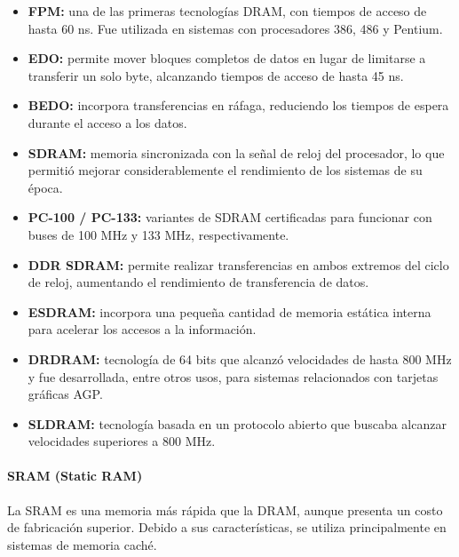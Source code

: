 \documentclass[10pt]{article}
\begin{document}
\begin{itemize}
\item \textbf{FPM:} una de las primeras tecnologías DRAM, con tiempos de acceso de hasta 60 ns. Fue utilizada en sistemas con procesadores 386, 486 y Pentium.

\item \textbf{EDO:} permite mover bloques completos de datos en lugar de limitarse a transferir un solo byte, alcanzando tiempos de acceso de hasta 45 ns.

\item \textbf{BEDO:} incorpora transferencias en ráfaga, reduciendo los tiempos de espera durante el acceso a los datos.

\item \textbf{SDRAM:} memoria sincronizada con la señal de reloj del procesador, lo que permitió mejorar considerablemente el rendimiento de los sistemas de su época.

\item \textbf{PC-100 / PC-133:} variantes de SDRAM certificadas para funcionar con buses de 100 MHz y 133 MHz, respectivamente.

\item \textbf{DDR SDRAM:} permite realizar transferencias en ambos extremos del ciclo de reloj, aumentando el rendimiento de transferencia de datos.

\item \textbf{ESDRAM:} incorpora una pequeña cantidad de memoria estática interna para acelerar los accesos a la información.

\item \textbf{DRDRAM:} tecnología de 64 bits que alcanzó velocidades de hasta 800 MHz y fue desarrollada, entre otros usos, para sistemas relacionados con tarjetas gráficas AGP.

\item \textbf{SLDRAM:} tecnología basada en un protocolo abierto que buscaba alcanzar velocidades superiores a 800 MHz.

\end{itemize}

\paragraph{SRAM (Static RAM)}

La SRAM es una memoria más rápida que la DRAM, aunque presenta un costo de fabricación superior. Debido a sus características, se utiliza principalmente en sistemas de memoria caché.
\end{document}
